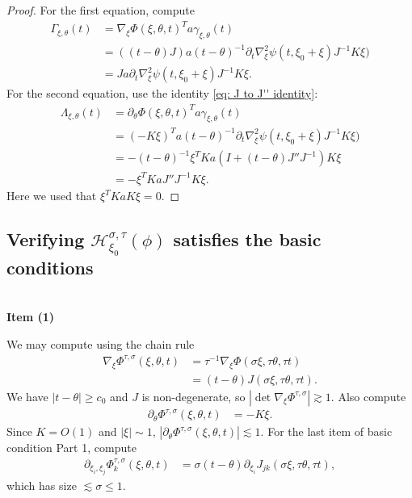 \documentclass[12pt]{amsart}
\numberwithin{equation}{section}
\newcommand{\1}{\mathbbm{1}}
\newcommand{\xixi}{\xi_0 + \xi}
\begin{document}
\begin{proof}
    For the first equation, compute
    \begin{align}
        \Gamma_{\xi,\theta}(t) &= \nabla_\xi \Phi(\xi,\theta,t)^T a \gamma_{\xi,\theta}(t) \\
        &= ((t-\theta) J)a (t-\theta)^{-1} \partial_t \nabla_\xi^2 \psi(t,\xixi) J^{-1} K \xi) \\
        &= Ja \partial_t \nabla_\xi^2 \psi(t,\xixi) J^{-1}K\xi.
    \end{align}
    For the second equation, use the identity \eqref{eq: J to J'' identity}: 
    \begin{align}
        \Lambda_{\xi,\theta}(t) &= \partial_\theta \Phi(\xi,\theta,t)^T a \gamma_{\xi,\theta}(t) \\
        &= (-K \xi)^T a (t-\theta)^{-1} \partial_t \nabla_\xi^2 \psi(t,\xixi) J^{-1} K \xi) \\
        &= -(t -\theta)^{-1} \xi^T K a(I + (t-\theta) J''J^{-1}) K\xi\\
        &= -\xi^T Ka J'' J^{-1}K \xi. 
    \end{align}
    Here we used that $\xi^T KaK\xi=0$.
\end{proof}


\subsection{Verifying $\mathcal H_{\xi_0}^{\sigma, \tau}(\phi)$ satisfies the basic conditions}

\ \\
\noindent \textbf{Item (1)}

We may compute using the chain rule
\begin{align}
    \nabla_\xi \Phi^{\tau,\sigma}(\xi, \theta,t) &= \tau^{-1} \nabla_\xi \Phi(\sigma \xi, \tau \theta, \tau t) \\
    &= (t - \theta) J(\sigma \xi, \tau \theta, \tau t). 
\end{align}
We have $|t - \theta| \geq c_0$ and $J$ is non-degenerate, so 
$|\det \nabla_\xi \Phi^{\tau, \sigma}| \gtrsim 1$. Also compute 
\begin{align}
    \partial_\theta \Phi^{\tau, \sigma}(\xi,\theta,t) &= -K\xi.
\end{align}
Since $K=O(1)$ and $|\xi| \sim 1$, $|\partial_\theta \Phi^{\tau, \sigma}(\xi, \theta, t)| \lesssim 1$. For the last item of basic condition Part 1, compute 
\begin{align}
    \partial_{\xi_i, \xi_j} \Phi_k^{\tau, \sigma}(\xi,\theta,t) &=
    \sigma (t - \theta) \partial_{\xi_i} J_{jk}(\sigma \xi, \tau \theta, \tau t), 
\end{align}
which has size $\lesssim \sigma \leq 1$.  
\end{document}
